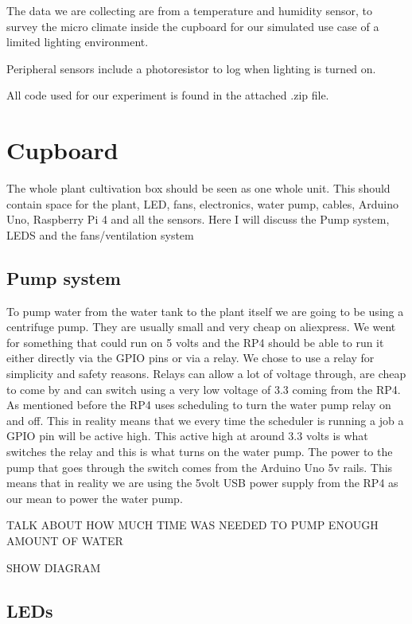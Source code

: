 \documentclass[a4paper,12pt,twoside,openright,titlepage]{book}
\begin{document}
The data we are collecting are from a temperature and humidity sensor, to survey the micro climate inside the cupboard for our simulated use case of a limited lighting environment.

Peripheral sensors include a photoresistor to log when lighting is turned on.

All code used for our experiment is found in the attached .zip file.

\section{Cupboard}

The whole plant cultivation box should be seen as one whole unit. This should contain space for the plant, LED, fans, electronics, water pump, cables, Arduino Uno, Raspberry Pi 4 and all the sensors.
Here I will discuss the Pump system, LEDS and the fans/ventilation system

\subsection{Pump system}
To pump water from the water tank to the plant itself we are going to be using a centrifuge pump. They are usually small and very cheap on aliexpress. We went for something that could run on 5 volts and the RP4 should be able to run it either directly via the GPIO pins or via a relay.
We chose to use a relay for simplicity and safety reasons. Relays can allow a lot of voltage through, are cheap to come by and can switch using a very low voltage of 3.3 coming from the RP4.
As mentioned before the RP4 uses scheduling to turn the water pump relay on and off. This in reality means that we every time the scheduler is running a job a GPIO pin will be active high. This active high at around 3.3 volts is what switches the relay and this is what turns on the water pump. The power to the pump that goes through the switch comes from the Arduino Uno 5v rails. This means that in reality we are using the 5volt USB power supply from the RP4 as our mean to power the water pump.

TALK ABOUT HOW MUCH TIME WAS NEEDED TO PUMP ENOUGH AMOUNT OF WATER

SHOW DIAGRAM

\subsection{LEDs}
\end{document}
